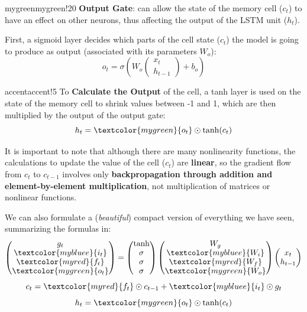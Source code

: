 \begin{remark}{mygreen}{mygreen!20}
\textbf{Output Gate}: can allow the state of the memory cell ($c_t$) to have an effect on other neurons, thus affecting the output of the LSTM unit ($h_t$).

First, a sigmoid layer decides which parts of the cell state ($c_t$) the model is going to produce as output (associated with its parameters $W_o$):
$$ o_t = \sigma(W_o
\begin{pmatrix}
x_t \\
h_{t-1}
\end{pmatrix} + b_o)
$$
\end{remark}

\begin{remark}{accent}{accent!5}
To \textbf{Calculate the Output} of the cell, a tanh layer is used on the state of the memory cell to shrink values between -1 and 1, which are then multiplied by the output of the output gate:
$$h_t = \textcolor{mygreen}{o_t} \odot \text{tanh}(c_t) $$
\end{remark}

It is important to note that although there are many nonlinearity functions, the calculations to update the value of the cell ($c_t$) are \textbf{linear}, so the gradient flow from $c_t$ to $c_{t-1}$ involves only \textbf{backpropagation through addition and element-by-element multiplication}, not multiplication of matrices or nonlinear functions.

We can also formulate a (\textit{beautiful}) compact version of everything we have seen, summarizing the formulas in:
$$
\setlength{\arraycolsep}{5pt}
\renewcommand{\arraystretch}{0.95}
\begin{pmatrix}
g_t \\
\textcolor{mybluee}{i_t} \\
\textcolor{myred}{f_t} \\
\textcolor{mygreen}{o_t} 
\end{pmatrix} = 
\begin{pmatrix}
\text{tanh} \\
\sigma \\
\sigma \\
\sigma 
\end{pmatrix}
\begin{pmatrix}
W_g \\
\textcolor{mybluee}{W_i} \\
\textcolor{myred}{W_f} \\
\textcolor{mygreen}{W_o}
\end{pmatrix}
\begin{pmatrix}
x_t \\
h_{t-1}
\end{pmatrix}
$$
$$c_t = \textcolor{myred}{f_t} \odot c_{t-1} + \textcolor{mybluee}{i_t} \odot g_t $$
$$h_t = \textcolor{mygreen}{o_t} \odot \text{tanh}(c_t) $$

